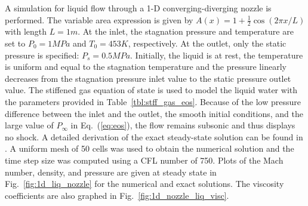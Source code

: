 \documentclass[review,10pt]{elsarticle}
\newcommand{\eqt}[1]{Eq.~(\ref{#1})}                     %
\newcommand{\fig}[1]{Fig.~\ref{#1}}                      %
\newcommand{\tbl}[1]{Table~\ref{#1}}                     %
\begin{document}
A simulation for liquid flow through a 1-D converging-diverging nozzle is performed. The variable area expression is given by 
$A(x) = 1 + \tfrac{1}{2} \cos(2 \pi x / L)$ with length $L=1m$.  At the inlet, the stagnation pressure and temperature are set 
to $P_0 = 1 MPa$ and $T_0 = 453 K$, respectively. At the outlet, only the static pressure is specified: $P_s = 0.5 MPa$. 
Initially, the liquid is at rest, the temperature is uniform and equal to the stagnation temperature and the pressure 
linearly decreases from the stagnation pressure inlet value to the static pressure outlet value. 
The stiffened gas equation of state is used to model the liquid water with the parameters provided in \tbl{tbl:stff_gas_eos}.
Because of the low pressure difference between the inlet and the outlet, the smooth initial conditions, 
and the large value of $P_\infty$ in \eqt{eq:eos}, the flow remains subsonic and thus displays no shock. A detailed 
derivation of the exact steady-state solution can be found in \cite{nozzle_exact}. A uniform mesh of 
50 cells was used to obtain the numerical solution and the time step size was computed using a CFL number of 750.
Plots of the Mach number, density, and pressure are given at steady state in \fig{fig:1d_liq_nozzle} 
for the numerical and exact solutions. The viscosity coefficients are also graphed in \fig{fig:1d_nozzle_liq_visc}. 
%
\end{document}
